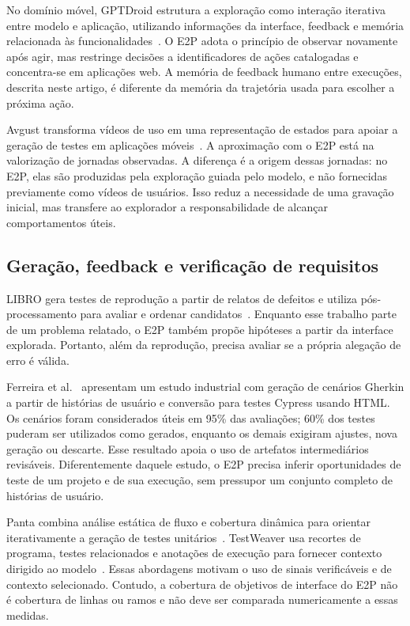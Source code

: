 \documentclass[12pt]{article}
\begin{document}
No domínio móvel, GPTDroid estrutura a exploração como interação iterativa entre modelo e aplicação, utilizando informações da interface, feedback e memória relacionada às funcionalidades~\cite{liu2024gptdroid}. O E2P adota o princípio de observar novamente após agir, mas restringe decisões a identificadores de ações catalogadas e concentra-se em aplicações web. A memória de feedback humano entre execuções, descrita neste artigo, é diferente da memória da trajetória usada para escolher a próxima ação.

Avgust transforma vídeos de uso em uma representação de estados para apoiar a geração de testes em aplicações móveis~\cite{zhao2022avgust}. A aproximação com o E2P está na valorização de jornadas observadas. A diferença é a origem dessas jornadas: no E2P, elas são produzidas pela exploração guiada pelo modelo, e não fornecidas previamente como vídeos de usuários. Isso reduz a necessidade de uma gravação inicial, mas transfere ao explorador a responsabilidade de alcançar comportamentos úteis.

\subsection{Geração, feedback e verificação de requisitos}
LIBRO gera testes de reprodução a partir de relatos de defeitos e utiliza pós-processamento para avaliar e ordenar candidatos~\cite{kang2023libro}. Enquanto esse trabalho parte de um problema relatado, o E2P também propõe hipóteses a partir da interface explorada. Portanto, além da reprodução, precisa avaliar se a própria alegação de erro é válida.

Ferreira et al.~\cite{ferreira2025acceptance} apresentam um estudo industrial com geração de cenários Gherkin a partir de histórias de usuário e conversão para testes Cypress usando HTML. Os cenários foram considerados úteis em 95\% das avaliações; 60\% dos testes puderam ser utilizados como gerados, enquanto os demais exigiram ajustes, nova geração ou descarte. Esse resultado apoia o uso de artefatos intermediários revisáveis. Diferentemente daquele estudo, o E2P precisa inferir oportunidades de teste de um projeto e de sua execução, sem pressupor um conjunto completo de histórias de usuário.

Panta combina análise estática de fluxo e cobertura dinâmica para orientar iterativamente a geração de testes unitários~\cite{gu2026panta}. TestWeaver usa recortes de programa, testes relacionados e anotações de execução para fornecer contexto dirigido ao modelo~\cite{le2026testweaver}. Essas abordagens motivam o uso de sinais verificáveis e de contexto selecionado. Contudo, a cobertura de objetivos de interface do E2P não é cobertura de linhas ou ramos e não deve ser comparada numericamente a essas medidas.
\end{document}
